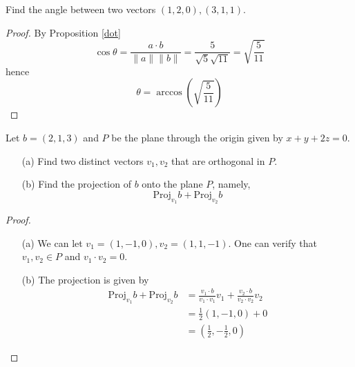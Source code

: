\documentclass[openany]{book}
\begin{document}
\begin{prob}
    Find the angle between two vectors $(1,2,0), (3,1,1)$.
\end{prob}
\begin{proof}
    By Proposition \ref{dot} 
    \begin{equation*}
        \cos\theta=\frac{a\cdot b}{\|a\|\|b\|}=\frac{5}{\sqrt{5}\sqrt{11}}=\sqrt{\frac{5}{11}}
    \end{equation*}
    hence 
    \begin{equation*}
        \theta=\arccos\left(\sqrt{\frac{5}{11}}\right)
    \end{equation*}
\end{proof}

\begin{prob}
    Let $b=(2,1,3)$ and $P$ be the plane through the origin given by $x+y+2z=0$. 
    \begin{enumerate}
        \item[(a)] Find two distinct vectors $v_1,v_2$ that are orthogonal in $P$.
        \item[(b)] Find the projection of $b$ onto the plane $P$, namely, 
        \begin{equation*}
            \text{Proj}_{v_1}b+\text{Proj}_{v_2}b
        \end{equation*}
    \end{enumerate}
\end{prob}
\begin{proof}
    \begin{enumerate}
        \item[(a)] We can let $v_1=(1,-1,0), v_2=(1,1,-1)$. One can verify that $v_1,v_2\in P$ and $v_1\cdot v_2=0$.
        \item[(b)] The projection is given by
        \begin{align*}
            \text{Proj}_{v_1}b+\text{Proj}_{v_2}b&=\frac{v_1\cdot b}{v_1\cdot v_1}v_1+\frac{v_2\cdot b}{v_2\cdot v_2}v_2\\
            &=\frac{1}{2}(1,-1,0)+0\\
            &=\left(\frac{1}{2}, -\frac{1}{2}, 0\right)
        \end{align*}
    \end{enumerate}
\end{proof}
\end{document}
